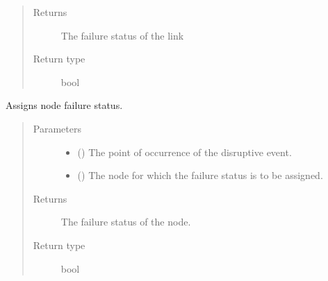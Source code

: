 \documentclass[letterpaper,10pt,english]{sphinxmanual}
\begin{document}
\begin{fulllineitems}
\begin{fulllineitems}
\begin{quote}
\begin{description}
\begin{itemize}
\end{itemize}

\item[{Returns}] \leavevmode
\sphinxAtStartPar
The failure status of the link

\item[{Return type}] \leavevmode
\sphinxAtStartPar
bool

\end{description}\end{quote}

\end{fulllineitems}


\begin{fulllineitems}
\label{\detokenize{apidoc:dreaminsg_integrated_model.src.hazard_initiator.RadialDisruption.assign_node_failure}}
\sphinxAtStartPar
Assigns node failure status.
\begin{quote}\begin{description}
\item[{Parameters}] \leavevmode\begin{itemize}
\item {} 
\sphinxAtStartPar
{} () \textendash{} The point of occurrence of the disruptive event.

\item {} 
\sphinxAtStartPar
{} () \textendash{} The node for which the failure status is to be assigned.

\end{itemize}

\item[{Returns}] \leavevmode
\sphinxAtStartPar
The failure status of the node.

\item[{Return type}] \leavevmode
\sphinxAtStartPar
bool

\end{description}\end{quote}

\end{fulllineitems}


\end{fulllineitems}
\end{document}
